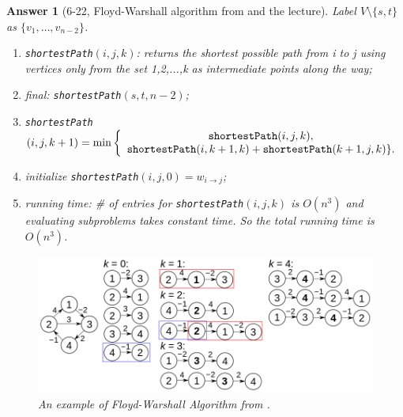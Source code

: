 \documentclass[11pt]{article}
\theoremstyle{numberplain}
\theoremstyle{nonumberplain}
\newtheorem{ans}{Answer}
\newcommand{\0}{{\mathbf{0}}}
\begin{document}
\begin{ans}[6-22, Floyd-Warshall algorithm from \cite{wikipedia} and the lecture]
Label $V\setminus\{s,t\}$ as $\{v_1,\ldots, v_{n-2}\}$.
\begin{enumerate}
\item {\tt shortestPath}$(i,j,k)$: returns the shortest possible path from i to j using vertices only from the set {1,2,...,k} as intermediate points along the way;
\item final: {\tt shortestPath}$(s,t,n-2)$;
\item {\tt shortestPath}$(i,j,k+1) = \min\left\{
\begin{array}{c}
{\tt shortestPath}(i,j,k),\\ {\tt shortestPath}(i,k+1,k) + {\tt shortestPath}(k+1,j,k)\}.
\end{array}\right.$
\item initialize {\tt shortestPath}$(i,j,0)=w_{i\rightarrow j}$;
\item running time: \# of entries for {\tt shortestPath}$(i,j,k)$ is $O(n^3)$ and evaluating subproblems takes constant time. So the total running time is $O(n^3)$.
\end{enumerate}
\begin{figure}
\begin{center}
\includegraphics[width=\textwidth]{900px-Floyd-Warshall_example.svg.png}
\end{center}
\label{fig:example of Floyd-Warshall Algorithm}
\caption{An example of Floyd-Warshall Algorithm from \cite{wikipedia}.	}
\end{figure}
\end{ans}
\end{document}
